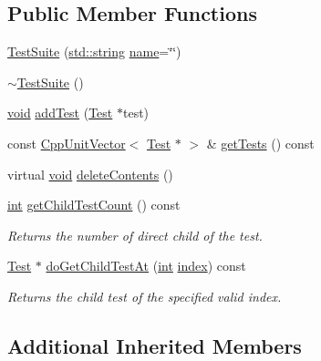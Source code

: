 \subsection*{Public Member Functions}
\begin{DoxyCompactItemize}
\item 
\hyperlink{class_test_suite_aedef358022b725810f2f145ac078c01b}{Test\-Suite} (\hyperlink{glew_8h_ae84541b4f3d8e1ea24ec0f466a8c568b}{std\-::string} \hyperlink{fmod__codec_8h_a5c4947d4516dd7cfa3505ce3a648a4ef}{name}=\char`\"{}\char`\"{})
\item 
\hyperlink{class_test_suite_a1a4603e985169c62d251876dd3910b5e}{$\sim$\-Test\-Suite} ()
\item 
\hyperlink{wglew_8h_aeea6e3dfae3acf232096f57d2d57f084}{void} \hyperlink{class_test_suite_a8cd9628eee382a9670076765ec25cfa8}{add\-Test} (\hyperlink{class_test}{Test} $\ast$test)
\item 
const \hyperlink{_cpp_unit_vector_8h_ab1af16468212807e5cc231dc1ef32323}{Cpp\-Unit\-Vector}$<$ \hyperlink{class_test}{Test} $\ast$ $>$ \& \hyperlink{class_test_suite_ad2bd3e20523bb357b7a4608a7978ea49}{get\-Tests} () const 
\item 
virtual \hyperlink{wglew_8h_aeea6e3dfae3acf232096f57d2d57f084}{void} \hyperlink{class_test_suite_ac968917f934d102227abd8b2130e67f9}{delete\-Contents} ()
\item 
\hyperlink{wglew_8h_a500a82aecba06f4550f6849b8099ca21}{int} \hyperlink{class_test_suite_aeaabfd3afef12412cd390b90128a7d87}{get\-Child\-Test\-Count} () const 
\begin{DoxyCompactList}\small\item\em Returns the number of direct child of the test. \end{DoxyCompactList}\item 
\hyperlink{class_test}{Test} $\ast$ \hyperlink{class_test_suite_aab4d1f64d7b32a24489cc2a3f3e412ee}{do\-Get\-Child\-Test\-At} (\hyperlink{wglew_8h_a500a82aecba06f4550f6849b8099ca21}{int} \hyperlink{fmod__codec_8h_a57f14e05b1900f16a2da82ade47d0c6d}{index}) const 
\begin{DoxyCompactList}\small\item\em Returns the child test of the specified valid index. \end{DoxyCompactList}\end{DoxyCompactItemize}
\subsection*{Additional Inherited Members}


